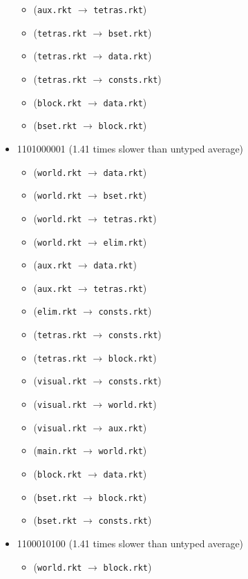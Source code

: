 \documentclass{article}
\newcommand{\mono}[1]{\texttt{#1}}
\begin{document}
\begin{itemize}
\begin{itemize}
  \item (\mono{aux.rkt} $\rightarrow$ \mono{tetras.rkt})
  \item (\mono{tetras.rkt} $\rightarrow$ \mono{bset.rkt})
  \item (\mono{tetras.rkt} $\rightarrow$ \mono{data.rkt})
  \item (\mono{tetras.rkt} $\rightarrow$ \mono{consts.rkt})
  \item (\mono{block.rkt} $\rightarrow$ \mono{data.rkt})
  \item (\mono{bset.rkt} $\rightarrow$ \mono{block.rkt})
  \end{itemize}
\item 1101000001 (1.41 times slower than untyped average)
  \begin{itemize}
  \item (\mono{world.rkt} $\rightarrow$ \mono{data.rkt})
  \item (\mono{world.rkt} $\rightarrow$ \mono{bset.rkt})
  \item (\mono{world.rkt} $\rightarrow$ \mono{tetras.rkt})
  \item (\mono{world.rkt} $\rightarrow$ \mono{elim.rkt})
  \item (\mono{aux.rkt} $\rightarrow$ \mono{data.rkt})
  \item (\mono{aux.rkt} $\rightarrow$ \mono{tetras.rkt})
  \item (\mono{elim.rkt} $\rightarrow$ \mono{consts.rkt})
  \item (\mono{tetras.rkt} $\rightarrow$ \mono{consts.rkt})
  \item (\mono{tetras.rkt} $\rightarrow$ \mono{block.rkt})
  \item (\mono{visual.rkt} $\rightarrow$ \mono{consts.rkt})
  \item (\mono{visual.rkt} $\rightarrow$ \mono{world.rkt})
  \item (\mono{visual.rkt} $\rightarrow$ \mono{aux.rkt})
  \item (\mono{main.rkt} $\rightarrow$ \mono{world.rkt})
  \item (\mono{block.rkt} $\rightarrow$ \mono{data.rkt})
  \item (\mono{bset.rkt} $\rightarrow$ \mono{block.rkt})
  \item (\mono{bset.rkt} $\rightarrow$ \mono{consts.rkt})
  \end{itemize}
\item 1100010100 (1.41 times slower than untyped average)
  \begin{itemize}
  \item (\mono{world.rkt} $\rightarrow$ \mono{block.rkt})

\end{itemize}
\end{itemize}
\end{document}
